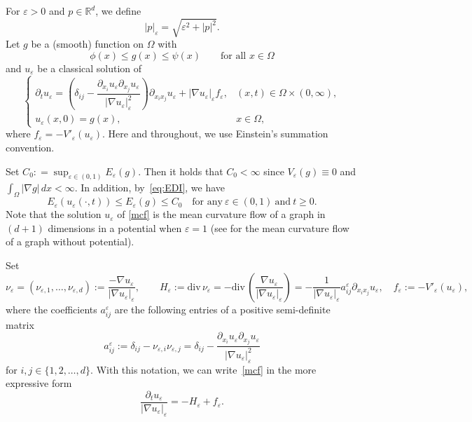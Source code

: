 \documentclass{amsart}
\theoremstyle{definition}
\def\R{{\mathbb{R}}}
\newcommand{\divergence}{\mathrm{div}\,}
\begin{document}
For $\varepsilon >0$ and $p \in \R^d$, 
we define 
\begin{equation}
    |p|_\varepsilon = \sqrt{ \varepsilon ^2+|p|^2}.
\end{equation}
Let $g$ be a (smooth) function on $\Omega$ 
with 
\begin{equation}
    \phi (x) \leq g(x) \leq \psi (x) \qquad 
    \text{for all }  x \in \Omega
\end{equation}
and $u_\varepsilon$ be a classical solution of 
\begin{equation}
\left\{ 
\begin{array}{ll}
\partial_t u_\varepsilon 
=\left( \delta_{ij} - \dfrac{\partial_{x_i} u_\varepsilon \partial_{x_j} u_\varepsilon}{|\nabla u_\varepsilon |_\varepsilon^2} \right) \partial_{x_i x_j} u_\varepsilon
+ |\nabla u_\varepsilon|_\varepsilon f_\varepsilon ,& (x,t)\in \Omega \times (0, \infty),  \\
u_\varepsilon (x,0) = g (x) ,  &x\in \Omega,
\end{array} \right.
\label{mcf}
\end{equation}
where $f_\varepsilon = -V' _\varepsilon(u_\varepsilon)$. 
Here and throughout, we use Einstein's summation convention.

Set $C_0: =\sup_{\varepsilon \in (0,1)} E_\varepsilon (g)$. Then it holds that $C_0<\infty$ 
since $V_\varepsilon (g) \equiv 0$ and $\int _\Omega |\nabla g| \, dx <\infty$.
In addition, by~\eqref{eq:EDI}, we have
\begin{equation}
\label{eq:monotone}
E_\varepsilon (u_\varepsilon (\cdot,t)) \leq E_\varepsilon (g) \leq C_0
\quad
\text{for any} 
\ \varepsilon \in (0,1) \ \text{and} \ t\geq 0.
\end{equation}
Note that the solution $u_\varepsilon$ of \eqref{mcf} is the mean curvature flow of a graph in $(d+1)$ dimensions in a potential when $\varepsilon=1$ (see \cite{MR1025164} for the mean curvature flow of a graph without potential).

\bigskip

Set
\[
\nu_\varepsilon = 
(\nu_{\varepsilon,1}, \dots , \nu_{\varepsilon,d})
:=\frac{-\nabla u_\varepsilon }{ |\nabla u_\varepsilon|_\varepsilon }, \qquad
H_\varepsilon 
:=
\divergence \nu_\varepsilon
=
-\divergence\left( \frac{\nabla u_\varepsilon }{ |\nabla u_\varepsilon|_\varepsilon }\right)
=-\frac{1}{|\nabla u_\varepsilon|_\varepsilon}
a_{ij} ^\varepsilon \partial_{x_i x_j} u_\varepsilon, \quad 
f_\varepsilon := - V' _\varepsilon(u_\varepsilon),
\]
where the coefficients $a_{ij}^\varepsilon$ are the following entries of a positive semi-definite matrix
\[
a_{ij} ^\varepsilon 
:= 
\delta_{ij} - \nu_{\varepsilon,i} \nu_{\varepsilon,j}
=
\delta_{ij} - \frac{\partial_{x_i} u_\varepsilon \partial _{x_j} u_\varepsilon}{|\nabla u_\varepsilon|_\varepsilon ^2}
\]
for $i,j \in \{1,2,\dots, d\}$. 
With this notation, we can write~\eqref{mcf} in the more expressive form
\[
\frac{\partial_t u_\varepsilon}{|\nabla u_\varepsilon|_\varepsilon}
=-H_\varepsilon + f_\varepsilon.
\]
\end{document}
